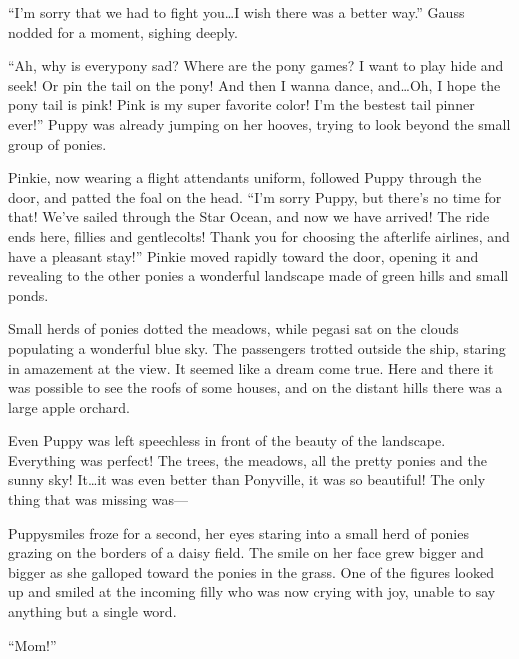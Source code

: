 ``I'm sorry that we had to fight you\dots I wish there was a better way.'' Gauss nodded for a moment, sighing deeply.

``Ah, why is everypony sad? Where are the pony games? I want to play hide and seek! Or pin the tail on the pony! And then I wanna dance, and\dots Oh, I hope the pony tail is pink! Pink is my super favorite color! I'm the bestest tail pinner ever!'' Puppy was already jumping on her hooves, trying to look beyond the small group of ponies.

Pinkie, now wearing a flight attendants uniform, followed Puppy through the door, and patted the foal on the head. ``I'm sorry Puppy, but there's no time for that! We've sailed through the Star Ocean, and now we have arrived! The ride ends here, fillies and gentlecolts! Thank you for choosing the afterlife airlines, and have a pleasant stay!'' Pinkie moved rapidly toward the door, opening it and revealing to the other ponies a wonderful landscape made of green hills and small ponds.

Small herds of ponies dotted the meadows, while pegasi sat on the clouds populating a wonderful blue sky. The passengers trotted outside the ship, staring in amazement at the view. It seemed like a dream come true. Here and there it was possible to see the roofs of some houses, and on the distant hills there was a large apple orchard.

Even Puppy was left speechless in front of the beauty of the landscape. Everything was perfect! The trees, the meadows, all the pretty ponies and the sunny sky! It\dots it was even better than Ponyville, it was so beautiful! The only thing that was missing was---

Puppysmiles froze for a second, her eyes staring into a small herd of ponies grazing on the borders of a daisy field. The smile on her face grew bigger and bigger as she galloped toward the ponies in the grass. One of the figures looked up and smiled at the incoming filly who was now crying with joy, unable to say anything but a single word.

``Mom!''


